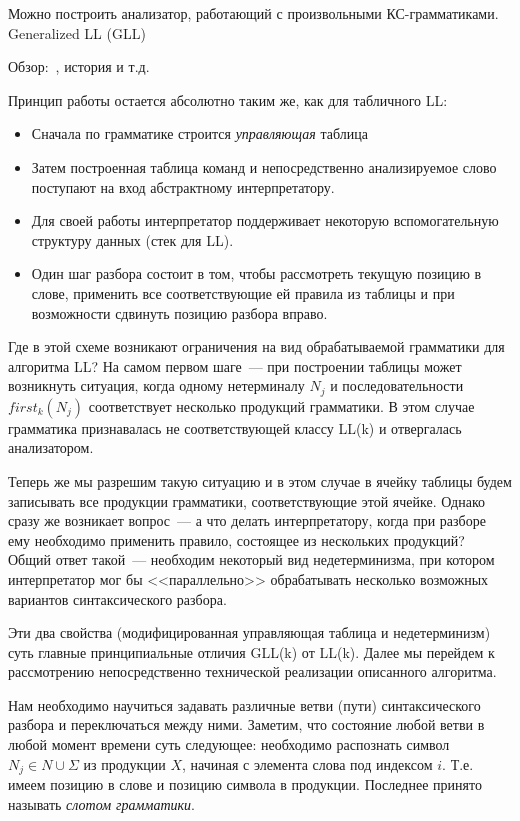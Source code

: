 Можно построить анализатор, работающий с произвольными КС-грамматиками.
Generalized LL (GLL)~\cite{Scott:2010:GP:1860132.1860320,10.1007/978-3-662-46663-6_5}

Обзор:~\cite{Cappers2014ExploringAV}, история и т.д.~\cite{Afroozeh2019PracticalGT}

Принцип работы остается абсолютно таким же, как для табличного LL:
\begin{itemize}
  \item Сначала по грамматике строится \textit{управляющая} таблица
  \item Затем построенная таблица команд и непосредственно анализируемое слово поступают на вход абстрактному интерпретатору.
  \item Для своей работы интерпретатор поддерживает некоторую вспомогательную структуру данных (стек для LL).
  \item Один шаг разбора состоит в том, чтобы рассмотреть текущую позицию в слове, применить все соответствующие ей правила из таблицы и при возможности сдвинуть позицию разбора вправо.
\end{itemize}

Где в этой схеме возникают ограничения на вид обрабатываемой грамматики для алгоритма LL? На самом первом шаге~--- при построении таблицы может возникнуть ситуация, когда одному нетерминалу $N_j$ и последовательности $first_k(N_j)$ соответствует несколько продукций грамматики. В этом случае грамматика признавалась не соответствующей классу LL(k) и отвергалась анализатором.

Теперь же мы разрешим такую ситуацию и в этом случае в ячейку таблицы будем записывать все продукции грамматики, соответствующие этой ячейке. Однако сразу же возникает вопрос~--- а что делать интерпретатору, когда при разборе ему необходимо применить правило, состоящее из нескольких продукций? Общий ответ такой~--- необходим некоторый вид недетерминизма, при котором интерпретатор мог бы <<параллельно>> обрабатывать несколько возможных вариантов синтаксического разбора.

Эти два свойства (модифицированная управляющая таблица и недетерминизм) суть главные принципиальные отличия GLL(k) от LL(k). Далее мы перейдем к рассмотрению непосредственно технической реализации описанного алгоритма.

Нам необходимо научиться задавать различные ветви (пути) синтаксического разбора и переключаться между ними. Заметим, что состояние любой ветви в любой момент времени суть следующее: необходимо распознать символ $N_j \in N \cup \Sigma$ из продукции $X$, начиная с элемента слова под индексом $i$. Т.е. имеем позицию в слове и позицию символа в продукции. Последнее принято называть \textit{слотом грамматики}.

